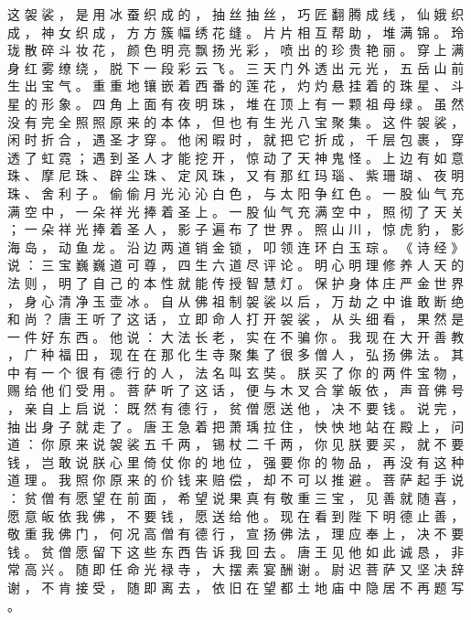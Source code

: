 {这 袈 裟 ， 是 用 冰 蚕 织 成 的 ， 抽 丝 抽 丝 ， 巧 匠 翻 腾 成 线 ， 仙 娥 织 成 ， 神 女 织 成 ， 方 方 簇 幅 绣 花 缝 。
片 片 相 互 帮 助 ， 堆 满 锦 。
玲 珑 散 碎 斗 妆 花 ， 颜 色 明 亮 飘 扬 光 彩 ， 喷 出 的 珍 贵 艳 丽 。
穿 上 满 身 红 雾 缭 绕 ， 脱 下 一 段 彩 云 飞 。
三 天 门 外 透 出 元 光 ， 五 岳 山 前 生 出 宝 气 。
重 重 地 镶 嵌 着 西 番 的 莲 花 ， 灼 灼 悬 挂 着 的 珠 星 、 斗 星 的 形 象 。
四 角 上 面 有 夜 明 珠 ， 堆 在 顶 上 有 一 颗 祖 母 绿 。
虽 然 没 有 完 全 照 照 原 来 的 本 体 ， 但 也 有 生 光 八 宝 聚 集 。
这 件 袈 裟 ， 闲 时 折 合 ， 遇 圣 才 穿 。
他 闲 暇 时 ， 就 把 它 折 成 ， 千 层 包 裹 ， 穿 透 了 虹 霓 ； 遇 到 圣 人 才 能 挖 开 ， 惊 动 了 天 神 鬼 怪 。
上 边 有 如 意 珠 、 摩 尼 珠 、 辟 尘 珠 、 定 风 珠 ， 又 有 那 红 玛 瑙 、 紫 珊 瑚 、 夜 明 珠 、 舍 利 子 。
偷 偷 月 光 沁 沁 白 色 ， 与 太 阳 争 红 色 。
一 股 仙 气 充 满 空 中 ， 一 朵 祥 光 捧 着 圣 上 。
一 股 仙 气 充 满 空 中 ， 照 彻 了 天 关 ； 一 朵 祥 光 捧 着 圣 人 ， 影 子 遍 布 了 世 界 。
照 山 川 ， 惊 虎 豹 ， 影 海 岛 ， 动 鱼 龙 。
沿 边 两 道 销 金 锁 ， 叩 领 连 环 白 玉 琮 。
《 诗 经 》 说 ： 三 宝 巍 巍 道 可 尊 ， 四 生 六 道 尽 评 论 。
明 心 明 理 修 养 人 天 的 法 则 ， 明 了 自 己 的 本 性 就 能 传 授 智 慧 灯 。
保 护 身 体 庄 严 金 世 界 ， 身 心 清 净 玉 壶 冰 。
自 从 佛 祖 制 袈 裟 以 后 ， 万 劫 之 中 谁 敢 断 绝 和 尚 ？ 唐 王 听 了 这 话 ， 立 即 命 人 打 开 袈 裟 ， 从 头 细 看 ， 果 然 是 一 件 好 东 西 。
他 说 ： 大 法 长 老 ， 实 在 不 骗 你 。
我 现 在 大 开 善 教 ， 广 种 福 田 ， 现 在 在 那 化 生 寺 聚 集 了 很 多 僧 人 ， 弘 扬 佛 法 。
其 中 有 一 个 很 有 德 行 的 人 ， 法 名 叫 玄 奘 。
朕 买 了 你 的 两 件 宝 物 ， 赐 给 他 们 受 用 。
菩 萨 听 了 这 话 ， 便 与 木 叉 合 掌 皈 依 ， 声 音 佛 号 ， 亲 自 上 启 说 ： 既 然 有 德 行 ， 贫 僧 愿 送 他 ， 决 不 要 钱 。
说 完 ， 抽 出 身 子 就 走 了 。
唐 王 急 着 把 萧 瑀 拉 住 ， 怏 怏 地 站 在 殿 上 ， 问 道 ： 你 原 来 说 袈 裟 五 千 两 ， 锡 杖 二 千 两 ， 你 见 朕 要 买 ， 就 不 要 钱 ， 岂 敢 说 朕 心 里 倚 仗 你 的 地 位 ， 强 要 你 的 物 品 ， 再 没 有 这 种 道 理 。
我 照 你 原 来 的 价 钱 来 赔 偿 ， 却 不 可 以 推 避 。
菩 萨 起 手 说 ： 贫 僧 有 愿 望 在 前 面 ， 希 望 说 果 真 有 敬 重 三 宝 ， 见 善 就 随 喜 ， 愿 意 皈 依 我 佛 ， 不 要 钱 ， 愿 送 给 他 。
现 在 看 到 陛 下 明 德 止 善 ， 敬 重 我 佛 门 ， 何 况 高 僧 有 德 行 ， 宣 扬 佛 法 ， 理 应 奉 上 ， 决 不 要 钱 。
贫 僧 愿 留 下 这 些 东 西 告 诉 我 回 去 。
唐 王 见 他 如 此 诚 恳 ， 非 常 高 兴 。
随 即 任 命 光 禄 寺 ， 大 摆 素 宴 酬 谢 。
尉 迟 菩 萨 又 坚 决 辞 谢 ， 不 肯 接 受 ， 随 即 离 去 ， 依 旧 在 望 都 土 地 庙 中 隐 居 不 再 题 写 。
}
